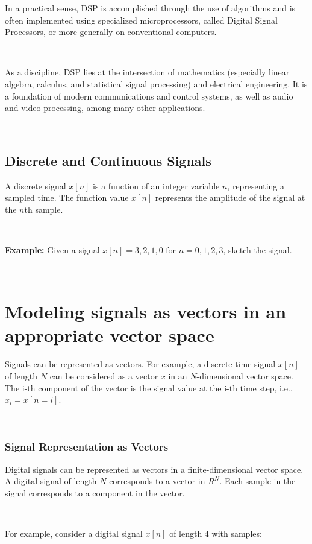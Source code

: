 \documentclass[11pt]{article}
\begin{document}
In a practical sense, DSP is accomplished through the use of algorithms and is often implemented using specialized microprocessors, called Digital Signal Processors, or more generally on conventional computers.

\ 


As a discipline, DSP lies at the intersection of mathematics (especially linear algebra, calculus, and statistical signal processing) and electrical engineering. It is a foundation of modern communications and control systems, as well as audio and video processing, among many other applications.

\ 


\subsection*{Discrete and Continuous Signals}

A discrete signal $x[n]$ is a function of an integer variable $n$, representing a sampled time. The function value $x[n]$ represents the amplitude of the signal at the $n$th sample.

\ 


\noindent \textbf{Example:} Given a signal $x[n] = {3, 2, 1, 0}$ for $n = {0, 1, 2, 3}$, sketch the signal.

\ 


\section*{Modeling signals as vectors in an appropriate vector space}

Signals can be represented as vectors. For example, a discrete-time signal $x[n]$ of length $N$ can be considered as a vector $x$ in an $N$-dimensional vector space. The i-th component of the vector is the signal value at the i-th time step, i.e., $x_i = x[n=i]$.

\ 

\subsubsection*{Signal Representation as Vectors}

Digital signals can be represented as vectors in a finite-dimensional vector space. A digital signal of length $N$ corresponds to a vector in $R^N$. Each sample in the signal corresponds to a component in the vector.

\ 

For example, consider a digital signal $x[n]$ of length 4 with samples:
\end{document}
